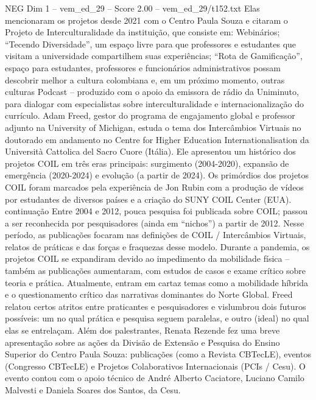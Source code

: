 \begin{textsample}{NEG Dim 1 – vem\_ed\_29 – Score 2.00 – vem\_ed\_29/t152.txt}
Elas mencionaram os projetos desde 2021 com o Centro Paula Souza e citaram o Projeto de Interculturalidade da instituição, que consiste em: Webinários; “Tecendo Diversidade”, um espaço livre para que professores e estudantes que visitam a universidade compartilhem suas experiências; “Rota de Gamificação”, espaço para estudantes, professores e funcionários administrativos possam descobrir melhor a cultura colombiana e, em um próximo momento, outras culturas Podcast – produzido com o apoio da emissora de rádio da Uniminuto, para dialogar com especialistas sobre interculturalidade e internacionalização do currículo.
Adam Freed, gestor do programa de engajamento global e professor adjunto na University of Michigan, estuda o tema dos Intercâmbios Virtuais no doutorado em andamento no Centre for Higher Education Internationalisation da Università Cattolica del Sacro Cuore (Itália).
Ele apresentou um histórico dos projetos COIL em três eras principais: surgimento (2004-2020), expansão de emergência (2020-2024) e evolução (a partir de 2024).
Os primórdios dos projetos COIL foram marcados pela experiência de Jon Rubin com a produção de vídeos por estudantes de diversos países e a criação do SUNY COIL Center (EUA). continuação Entre 2004 e 2012, pouca pesquisa foi publicada sobre COIL; passou a ser reconhecida por pesquisadores (ainda em “nichos”) a partir de 2012.
Nesse período, as publicações focaram nas definições de COIL / Intercâmbios Virtuais, relatos de práticas e das forças e fraquezas desse modelo.
Durante a pandemia, os projetos COIL se expandiram devido ao impedimento da mobilidade física – também as publicações aumentaram, com estudos de casos e exame crítico sobre teoria e prática.
Atualmente, entram em cartaz temas como a mobilidade híbrida e o questionamento crítico das narrativas dominantes do Norte Global.
Freed relatou certos atritos entre praticantes e pesquisadores e vislumbrou dois futuros possíveis: um no qual prática e pesquisa seguem paralelas, e outro (ideal) no qual elas se entrelaçam.
Além dos palestrantes, Renata Rezende fez uma breve apresentação sobre as ações da Divisão de Extensão e Pesquisa do Ensino Superior do Centro Paula Souza: publicações (como a Revista CBTecLE), eventos (Congresso CBTecLE) e Projetos Colaborativos Internacionais (PCIs / Cesu).
O evento contou com o apoio técnico de André Alberto Caciatore, Luciano Camilo Malvesti e Daniela Soares dos Santos, da Cesu.

\end{textsample}
